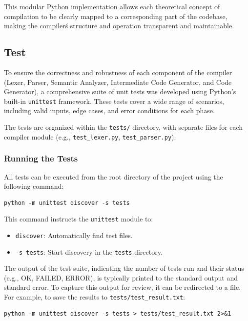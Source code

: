 \documentclass[12pt, letterpaper]{article}
\begin{document}
This modular Python implementation allows each theoretical concept of compilation to be clearly mapped to a corresponding part of the codebase, making the compiler\'s structure and operation transparent and maintainable.

\subsection*{Test}

To ensure the correctness and robustness of each component of the compiler (Lexer, Parser, Semantic Analyzer, Intermediate Code Generator, and Code Generator), a comprehensive suite of unit tests was developed using Python's built-in \texttt{unittest} framework. These tests cover a wide range of scenarios, including valid inputs, edge cases, and error conditions for each phase.

The tests are organized within the \texttt{tests/} directory, with separate files for each compiler module (e.g., \texttt{test\_lexer.py}, \texttt{test\_parser.py}).

\subsubsection*{Running the Tests}
All tests can be executed from the root directory of the project using the following command:

\begin{lstlisting}[language={}, basicstyle=\ttfamily\footnotesize, frame=none, breaklines=true]
python -m unittest discover -s tests
\end{lstlisting}

This command instructs the \texttt{unittest} module to:
\begin{itemize}
    \item \texttt{discover}: Automatically find test files.
    \item \texttt{-s tests}: Start discovery in the \texttt{tests} directory.
\end{itemize}

The output of the test suite, indicating the number of tests run and their status (e.g., OK, FAILED, ERROR), is typically printed to the standard output and standard error. To capture this output for review, it can be redirected to a file. For example, to save the results to \texttt{tests/test\_result.txt}:

\begin{lstlisting}[language={}, basicstyle=\ttfamily\footnotesize, frame=none, breaklines=true]
python -m unittest discover -s tests > tests/test_result.txt 2>&1
\end{lstlisting}
\end{document}
